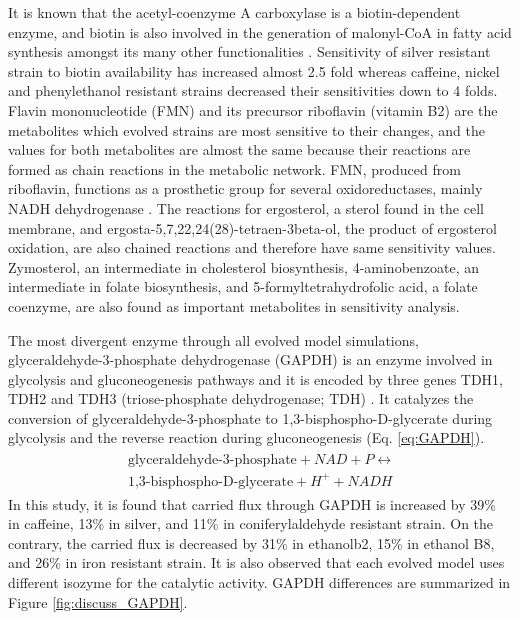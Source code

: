 It is known that the acetyl-coenzyme A carboxylase is a biotin-dependent enzyme, and biotin is also involved in the generation of malonyl-CoA in fatty acid synthesis amongst its many other functionalities \cite{hasslacher1993acetyl, morris1987yeast}. Sensitivity of silver resistant strain to biotin availability has increased almost 2.5 fold whereas caffeine, nickel and phenylethanol resistant strains decreased their sensitivities down to 4 folds. Flavin mononucleotide (FMN) and its precursor riboflavin (vitamin B2) are the metabolites which evolved strains are most sensitive to their changes, and the values for both metabolites are almost the same because their reactions are formed as chain reactions in the metabolic network. FMN, produced from riboflavin, functions as a prosthetic group for several oxidoreductases, mainly NADH dehydrogenase \cite{tsibris1966studies}. The reactions for ergosterol, a sterol found in the cell membrane, and ergosta-5,7,22,24(28)-tetraen-3beta-ol, the product of ergosterol oxidation, are also chained reactions and therefore have same sensitivity values. Zymosterol, an intermediate in cholesterol biosynthesis, 4-aminobenzoate, an intermediate in folate biosynthesis, and 5-formyltetrahydrofolic acid, a folate coenzyme, are also found as important metabolites in sensitivity analysis.

The most divergent enzyme through all evolved model simulations, glyceraldehyde-3-phosphate dehydrogenase (GAPDH) is an enzyme involved in glycolysis and gluconeogenesis pathways and it is encoded by three genes TDH1, TDH2 and TDH3 (triose-phosphate dehydrogenase; TDH) \cite{boucherie1995differential}. It catalyzes the conversion of glyceraldehyde-3-phosphate to 1,3-bisphospho-D-glycerate during glycolysis and the reverse reaction during gluconeogenesis (Eq. \ref{eq:GAPDH}).
\begin{align}
\label{eq:GAPDH}
\begin{split}
\ \text{glyceraldehyde-3-phosphate} + NAD + P \leftrightarrow \\
\ \text{1,3-bisphospho-D-glycerate} + H^+ + NADH
\end{split}
\end{align}
In this study, it is found that carried flux through GAPDH is increased by 39\% in caffeine, 13\% in silver, and 11\% in coniferylaldehyde resistant strain. On the contrary, the carried flux is decreased by 31\% in ethanolb2, 15\% in ethanol B8, and 26\% in iron resistant strain. It is also observed that each evolved model uses different isozyme for the catalytic activity. GAPDH differences are summarized in Figure \ref{fig:discuss_GAPDH}.

